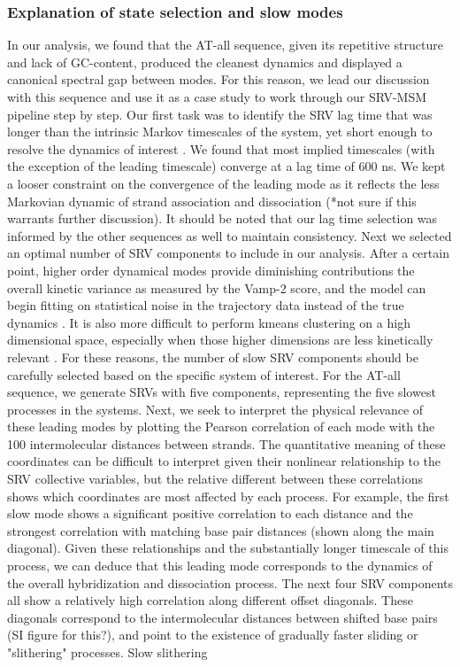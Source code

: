 \documentclass[journal=jpcbfk,manuscript=article]{achemso}
\begin{document}
\subsubsection{\label{sec:Results}Explanation of state selection and slow modes}

In our analysis, we found that the AT-all sequence, given its repetitive structure and lack of GC-content, produced the cleanest dynamics and displayed a canonical spectral gap between modes. For this reason, we lead our discussion with this sequence and use it as a case study to work through our SRV-MSM pipeline step by step. Our first task was to identify the SRV lag time that was longer than the intrinsic Markov timescales of the system, yet short enough to resolve the dynamics of interest \citep{Phys2018MarkovValidation}. We found that most implied timescales (with the exception of the leading timescale) converge at a lag time of 600 ns. We kept a looser constraint on the convergence of the leading mode as it reflects the less Markovian dynamic of strand association and dissociation (*not sure if this warrants further discussion). It should be noted that our lag time selection was informed by the other sequences as well to maintain consistency. Next we selected an optimal number of SRV components to include in our analysis. After a certain point, higher order dynamical modes provide diminishing contributions the overall kinetic variance as measured by the Vamp-2 score, and the model can begin fitting on statistical noise in the trajectory data instead of the true dynamics \citep{McGibbon2015VariationalKinetics}. It is also more difficult to perform kmeans clustering on a high dimensional space, especially when those higher dimensions are less kinetically relevant \citep{Pande2010EverythingAsk}. For these reasons, the number of slow SRV components should be carefully selected based on the specific system of interest. For the AT-all sequence, we generate SRVs with five components, representing the five slowest processes in the systems. Next, we seek to interpret the physical relevance of these leading modes by plotting the Pearson correlation of each mode with the 100 intermolecular distances between strands. The quantitative meaning of these coordinates can be difficult to interpret given their nonlinear relationship to the SRV collective variables, but the relative different between these correlations shows which coordinates are most affected by each process. For example, the first slow mode shows a significant positive correlation to each distance and the strongest correlation with matching base pair distances (shown along the main diagonal). Given these relationships and the substantially longer timescale of this process, we can deduce that this leading mode corresponds to the dynamics of the overall hybridization and dissociation process. The next four SRV components all show a relatively high correlation along different offset diagonals. These diagonals correspond to the intermolecular distances between shifted base pairs (SI figure for this?), and point to the existence of gradually faster sliding or "slithering" processes. Slow slithering 
\end{document}
